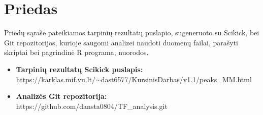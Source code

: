 \documentclass[12pt]{article}
\begin{document}

\section{Priedas}

Priedų sąraše pateikiamos tarpinių rezultatų puslapio, sugeneruoto
su Scikick, bei Git repozitorijos, kurioje saugomi analizei naudoti
duomenų failai, parašyti skriptai bei pagrindinė R programa, nuorodos.

\begin{itemize}
    \item \textbf{Tarpinių rezultatų Scikick puslapis:}\\
        https://karklas.mif.vu.lt/\(\sim\)dast6577/KursinisDarbas/v1.1/peaks\_MM.html
    \item \textbf{Analizės Git repozitorija:}\\
        https://github.com/dansta0804/TF\_analysis.git
  \end{itemize}
\end{document}
